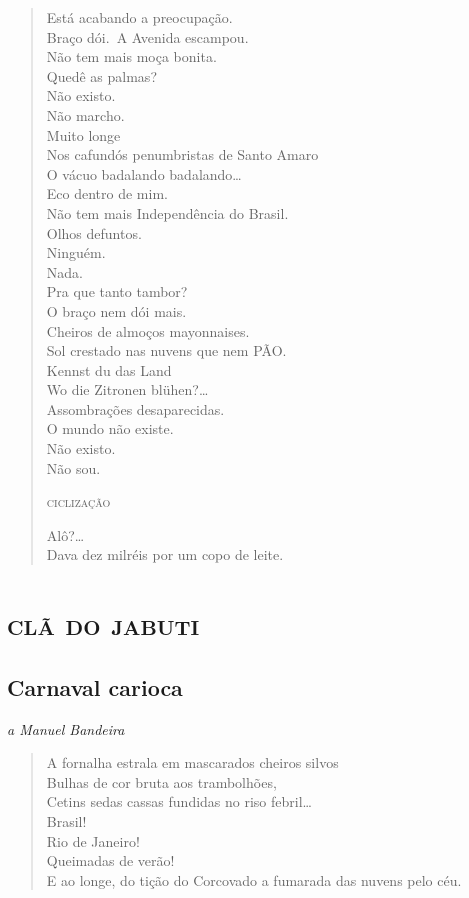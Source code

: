 {\begin{verse}
Está acabando a preocupação.\\
Braço dói.\
A Avenida escampou.\\
Não tem mais moça bonita.\\
Quedê as palmas?\\
Não existo.\\
Não marcho.\\
Muito longe\\
Nos cafundós penumbristas de Santo Amaro\\
O vácuo badalando badalando\ldots{}\\
Eco dentro de mim.\\
Não tem mais Independência do Brasil.\\
Olhos defuntos.\\
Ninguém.\\
Nada.\\
Pra que tanto tambor?\\
O braço nem dói mais.\\
Cheiros de almoços mayonnaises.\\
Sol crestado nas nuvens que nem PÃO.\\
\qquad\qquad Kennst du das Land\\
\qquad\qquad Wo die Zitronen blühen?\ldots{}\\
\qquad\qquad\qquad\qquad  Assombrações desaparecidas.\\
\qquad\qquad\qquad\qquad\qquad  O mundo não existe.\\
\qquad\qquad\qquad\qquad\qquad\qquad Não existo.\\
\qquad\qquad\qquad\qquad\qquad\qquad Não sou.

\qquad\qquad\qquad\quad\textsc{ciclização}

\qquad\qquad\qquad\qquad\qquad Alô?\ldots{}\\
Dava dez milréis por um copo de leite.
\end{verse}

\paginabranca
\part{\textsc{clã do jabuti}}

\chapter[Carnaval carioca]{Carnaval carioca }

\hfill\emph{a Manuel Bandeira}

\begin{verse}
A fornalha estrala em mascarados cheiros silvos\\
Bulhas de cor bruta aos trambolhões,\\
Cetins sedas cassas fundidas no riso febril\ldots{}\\
Brasil!\\
Rio de Janeiro!\\
Queimadas de verão!\\
E ao longe, do tição do Corcovado a fumarada das nuvens pelo céu.


\end{verse}}
